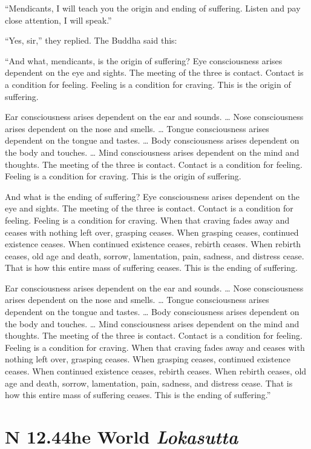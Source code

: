 \documentclass[12pt,openany]{book}%
\newcommand*{\suttatitleacronym}[1]{\smaller[2]{#1}\vspace*{.3em}}
\newcommand*{\suttatitletranslation}[1]{\linebreak{#1}}
\newcommand*{\suttatitleroot}[1]{\linebreak\smaller[2]\itshape{#1}}
\newcommand*{\tocacronym}[1]{\hspace*{-3.3em}{#1}\quad}
\newcommand*{\toctranslation}[1]{#1}
\newcommand*{\tocroot}[1]{(\textit{#1})}
\begin{document}
“Mendicants, I will teach you the origin and ending of suffering. Listen and pay close attention, I will speak.” 

“Yes, sir,” they replied. The Buddha said this: 

“And what, mendicants, is the origin of suffering? Eye consciousness arises dependent on the eye and sights. The meeting of the three is contact. Contact is a condition for feeling. Feeling is a condition for craving. This is the origin of suffering. 

Ear consciousness arises dependent on the ear and sounds. … Nose consciousness arises dependent on the nose and smells. … Tongue consciousness arises dependent on the tongue and tastes. … Body consciousness arises dependent on the body and touches. … Mind consciousness arises dependent on the mind and thoughts. The meeting of the three is contact. Contact is a condition for feeling. Feeling is a condition for craving. This is the origin of suffering. 

And what is the ending of suffering? Eye consciousness arises dependent on the eye and sights. The meeting of the three is contact. Contact is a condition for feeling. Feeling is a condition for craving. When that craving fades away and ceases with nothing left over, grasping ceases. When grasping ceases, continued existence ceases. When continued existence ceases, rebirth ceases. When rebirth ceases, old age and death, sorrow, lamentation, pain, sadness, and distress cease. That is how this entire mass of suffering ceases. This is the ending of suffering. 

Ear consciousness arises dependent on the ear and sounds. … Nose consciousness arises dependent on the nose and smells. … Tongue consciousness arises dependent on the tongue and tastes. … Body consciousness arises dependent on the body and touches. … Mind consciousness arises dependent on the mind and thoughts. The meeting of the three is contact. Contact is a condition for feeling. Feeling is a condition for craving. When that craving fades away and ceases with nothing left over, grasping ceases. When grasping ceases, continued existence ceases. When continued existence ceases, rebirth ceases. When rebirth ceases, old age and death, sorrow, lamentation, pain, sadness, and distress cease. That is how this entire mass of suffering ceases. This is the ending of suffering.” 

%
\section*{{\suttatitleacronym SN 12.44}{\suttatitletranslation The World }{\suttatitleroot Lokasutta}}
\addcontentsline{toc}{section}{\tocacronym{SN 12.44} \toctranslation{The World } \tocroot{Lokasutta}}
\end{document}
